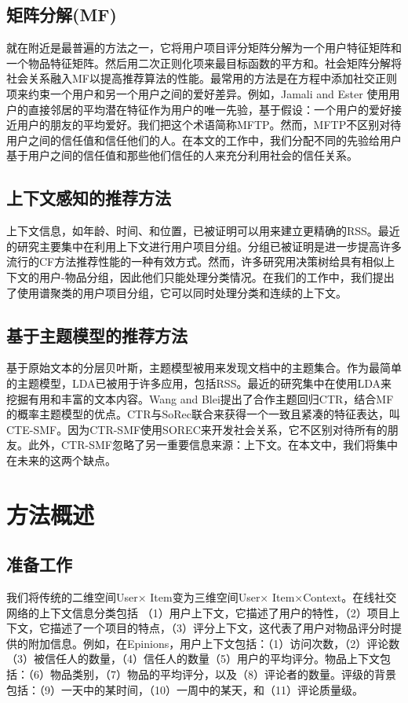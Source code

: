 \documentclass[10pt,a4paper]{article}
\theoremstyle{mythm}%
\numberwithin{equation}{section}
\begin{document}
\subsection{矩阵分解(MF)}
就在附近是最普遍的方法之一，它将用户项目评分矩阵分解为一个用户特征矩阵和一个物品特征矩阵。然后用二次正则化项来最目标函数的平方和。社会矩阵分解将社会关系融入MF以提高推荐算法的性能。最常用的方法是在方程中添加社交正则项来约束一个用户和另一个用户之间的爱好差异。例如，Jamali and Ester 使用用户的直接邻居的平均潜在特征作为用户的唯一先验，基于假设：一个用户的爱好接近用户的朋友的平均爱好。我们把这个术语简称MFTP。然而，MFTP不区别对待用户之间的信任值和信任他们的人。在本文的工作中，我们分配不同的先验给用户基于用户之间的信任值和那些他们信任的人来充分利用社会的信任关系。
\subsection{上下文感知的推荐方法}
上下文信息，如年龄、时间、和位置，已被证明可以用来建立更精确的RSS。最近的研究主要集中在利用上下文进行用户项目分组。分组已被证明是进一步提高许多流行的CF方法推荐性能的一种有效方式。然而，许多研究用决策树给具有相似上下文的用户-物品分组，因此他们只能处理分类情况。在我们的工作中，我们提出了使用谱聚类的用户项目分组，它可以同时处理分类和连续的上下文。
\subsection{基于主题模型的推荐方法}
基于原始文本的分层贝叶斯，主题模型被用来发现文档中的主题集合。作为最简单的主题模型，LDA已被用于许多应用，包括RSS。最近的研究集中在使用LDA来挖掘有用和丰富的文本内容。Wang and Blei提出了合作主题回归CTR，结合MF的概率主题模型的优点。CTR与SoRec联合来获得一个一致且紧凑的特征表达，叫CTE-SMF。因为CTR-SMF使用SOREC来开发社会关系，它不区别对待所有的朋友。此外，CTR-SMF忽略了另一重要信息来源：上下文。在本文中，我们将集中在未来的这两个缺点。

\section{方法概述}
%
%
%
%
\subsection{准备工作}
我们将传统的二维空间User× Item变为三维空间User× Item×Context。在线社交网络的上下文信息分类包括
（1）用户上下文，它描述了用户的特性，（2）项目上下文，它描述了一个项目的特点，（3）评分上下文，这代表了用户对物品评分时提供的附加信息。例如，在Epinions，用户上下文包括：（1）访问次数，（2）评论数（3）被信任人的数量，（4）信任人的数量（5）用户的平均评分。物品上下文包括：（6）物品类别，（7）物品的平均评分，以及（8）评论者的数量。评级的背景包括：（9）一天中的某时间，（10）一周中的某天，和（11）评论质量级。
\end{document}
